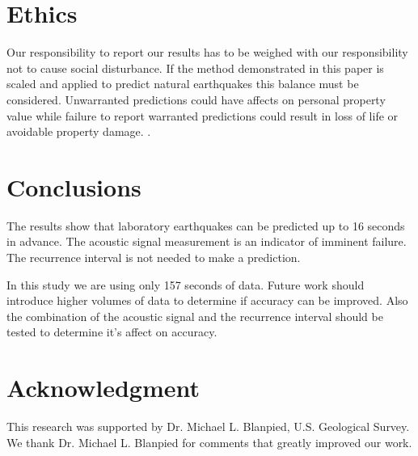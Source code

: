 \documentclass[]{llncs} %
\begin{document}
\section{Ethics}

Our responsibility to report our results has to be weighed with our responsibility not to cause social disturbance. If the method demonstrated in this paper is scaled and applied to predict natural earthquakes this balance must be considered. Unwarranted predictions could have affects on personal property value while failure to report warranted predictions could result in loss of life or avoidable property damage. \cite{Ayhan}. \par

\section{Conclusions}

The results show that laboratory earthquakes can be predicted up to 16 seconds in advance. The acoustic signal measurement is an indicator of imminent failure. The recurrence interval is not needed to make a prediction. \par

In this study we are using only 157 seconds of data. Future work should introduce higher volumes of data to determine if accuracy can be improved. Also the combination of the acoustic signal and the recurrence interval should be tested to determine it's affect on accuracy. 
\par

\section{Acknowledgment}
This research was supported by Dr. Michael L. Blanpied,  U.S. Geological Survey. We thank Dr. Michael L. Blanpied for comments that greatly improved our work.



\end{document}
